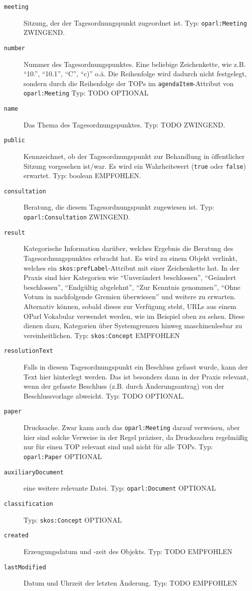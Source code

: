 \documentclass[,a4paper]{article}
\begin{document}
\begin{description}
\item[\texttt{meeting}]
Sitzung, der der Tagesordnungspunkt zugeordnet ist. Typ:
\texttt{oparl:Meeting} ZWINGEND.
\item[\texttt{number}]
Nummer des Tagesordnungspunktes. Eine beliebige Zeichenkette, wie z.B.
``10.'', ``10.1'', ``C'', ``c)'' o.ä. Die Reihenfolge wird dadurch nicht
festgelegt, sondern durch die Reihenfolge der TOPs im
\texttt{agendaItem}-Attribut von \texttt{oparl:Meeting} Typ: TODO
OPTIONAL
\item[\texttt{name}]
Das Thema des Tagesordnungspunktes. Typ: TODO ZWINGEND.
\item[\texttt{public}]
Kennzeichnet, ob der Tagesordnungspunkt zur Behandlung in öffentlicher
Sitzung vorgesehen ist/war. Es wird ein Wahrheitswert (\texttt{true}
oder \texttt{false}) erwartet. Typ: boolean EMPFOHLEN.
\item[\texttt{consultation}]
Beratung, die diesem Tagesordnungspunkt zugewiesen ist. Typ:
\texttt{oparl:Consultation} ZWINGEND.
\item[\texttt{result}]
Kategorische Information darüber, welches Ergebnis die Beratung des
Tagesordnungspunktes erbracht hat. Es wird zu einem Objekt verlinkt,
welches ein \texttt{skos:prefLabel}-Attribut mit einer Zeichenkette hat.
In der Praxis sind hier Kategorien wie ``Unverändert beschlossen'',
``Geändert beschlossen'', ``Endgültig abgelehnt'', ``Zur Kenntnis
genommen'', ``Ohne Votum in nachfolgende Gremien überwiesen'' und
weitere zu erwarten. Alternativ können, sobald dieses zur Verfügung
steht, URLs aus einem OParl Vokabular verwendet werden, wie im Beispiel
oben zu sehen. Diese dienen dazu, Kategorien über Systemgrenzen hinweg
maschinenlesbar zu vereinheitlichen. Typ: \texttt{skos:Concept}
EMPFOHLEN
\item[\texttt{resolutionText}]
Falls in diesem Tagesordnungspunkt ein Beschluss gefasst wurde, kann der
Text hier hinterlegt werden. Das ist besonders dann in der Praxis
relevant, wenn der gefasste Beschluss (z.B. durch Änderungsantrag) von
der Beschlussvorlage abweicht. Typ: TODO OPTIONAL.
\item[\texttt{paper}]
Drucksache. Zwar kann auch das \texttt{oparl:Meeting} darauf verweisen,
aber hier sind solche Verweise in der Regel präziser, da Drucksachen
regelmäßig nur für einen TOP relevant sind und nicht für alle TOPs. Typ:
\texttt{oparl:Paper} OPTIONAL
\item[\texttt{auxiliaryDocument}]
eine weitere relevante Datei. Typ: \texttt{oparl:Document} OPTIONAL
\item[\texttt{classification}]
Typ: \texttt{skos:Concept} OPTIONAL
\item[\texttt{created}]
Erzeugungsdatum und -zeit des Objekts. Typ: TODO EMPFOHLEN
\item[\texttt{lastModified}]
Datum und Uhrzeit der letzten Änderung. Typ: TODO EMPFOHLEN
\end{description}
\end{document}

